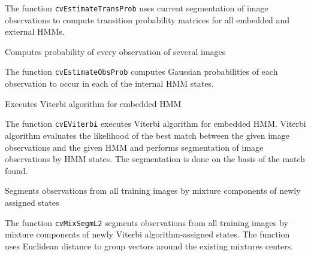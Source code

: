 The function \texttt{cvEstimateTransProb} uses current segmentation of image observations to compute transition probability matrices for all embedded and external HMMs.


Computes probability of every observation of several images


\begin{description}
\end{description}

The function \texttt{cvEstimateObsProb} computes Gaussian probabilities of each observation to occur in each of the internal HMM states.


Executes Viterbi algorithm for embedded HMM


\begin{description}
\end{description}

The function \texttt{cvEViterbi} executes Viterbi algorithm for embedded HMM. Viterbi algorithm evaluates the likelihood of the best match between the given image observations and the given HMM and performs segmentation of image observations by HMM states. The segmentation is done on the basis of the match found.


Segments observations from all training images by mixture components of newly assigned states


\begin{description}
\end{description}

The function \texttt{cvMixSegmL2} segments observations from all training images by mixture components of newly Viterbi algorithm-assigned states. The function uses Euclidean distance to group vectors around the existing mixtures centers.


